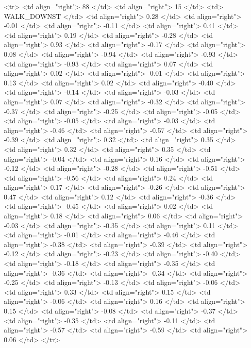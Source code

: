   <tr> <td align="right"> 88 </td> <td align="right">  15 </td> <td> WALK_DOWNST </td> <td align="right"> 0.28 </td> <td align="right"> -0.01 </td> <td align="right"> -0.11 </td> <td align="right"> 0.41 </td> <td align="right"> 0.19 </td> <td align="right"> -0.28 </td> <td align="right"> 0.93 </td> <td align="right"> -0.17 </td> <td align="right"> 0.08 </td> <td align="right"> -0.94 </td> <td align="right"> -0.93 </td> <td align="right"> -0.93 </td> <td align="right"> 0.07 </td> <td align="right"> 0.02 </td> <td align="right"> -0.01 </td> <td align="right"> 0.13 </td> <td align="right"> 0.02 </td> <td align="right"> -0.40 </td> <td align="right"> -0.14 </td> <td align="right"> -0.03 </td> <td align="right"> 0.07 </td> <td align="right"> -0.32 </td> <td align="right"> -0.37 </td> <td align="right"> -0.25 </td> <td align="right"> -0.05 </td> <td align="right"> -0.05 </td> <td align="right"> -0.03 </td> <td align="right"> -0.46 </td> <td align="right"> -0.57 </td> <td align="right"> -0.39 </td> <td align="right"> 0.32 </td> <td align="right"> 0.35 </td> <td align="right"> 0.32 </td> <td align="right"> 0.35 </td> <td align="right"> -0.04 </td> <td align="right"> 0.16 </td> <td align="right"> -0.12 </td> <td align="right"> -0.28 </td> <td align="right"> -0.51 </td> <td align="right"> -0.56 </td> <td align="right"> 0.24 </td> <td align="right"> 0.17 </td> <td align="right"> -0.26 </td> <td align="right"> 0.47 </td> <td align="right"> 0.12 </td> <td align="right"> -0.36 </td> <td align="right"> -0.45 </td> <td align="right"> 0.02 </td> <td align="right"> 0.18 </td> <td align="right"> 0.06 </td> <td align="right"> -0.03 </td> <td align="right"> -0.35 </td> <td align="right"> 0.11 </td> <td align="right"> -0.01 </td> <td align="right"> -0.46 </td> <td align="right"> -0.38 </td> <td align="right"> -0.39 </td> <td align="right"> -0.12 </td> <td align="right"> -0.23 </td> <td align="right"> -0.40 </td> <td align="right"> -0.18 </td> <td align="right"> -0.35 </td> <td align="right"> -0.36 </td> <td align="right"> -0.34 </td> <td align="right"> -0.25 </td> <td align="right"> -0.13 </td> <td align="right"> -0.06 </td> <td align="right"> 0.33 </td> <td align="right"> 0.15 </td> <td align="right"> -0.06 </td> <td align="right"> 0.16 </td> <td align="right"> 0.15 </td> <td align="right"> -0.08 </td> <td align="right"> -0.37 </td> <td align="right"> -0.35 </td> <td align="right"> -0.11 </td> <td align="right"> -0.57 </td> <td align="right"> -0.59 </td> <td align="right"> 0.06 </td> </tr>
